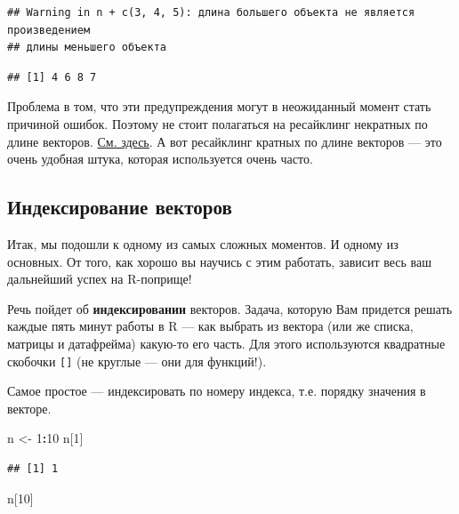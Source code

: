 \documentclass[]{book}
\newenvironment{Shaded}{\begin{snugshade}}{\end{snugshade}}
\newcommand{\DecValTok}[1]{\textcolor[rgb]{0.00,0.00,0.81}{#1}}
\newcommand{\StringTok}[1]{\textcolor[rgb]{0.31,0.60,0.02}{#1}}
\newcommand{\OperatorTok}[1]{\textcolor[rgb]{0.81,0.36,0.00}{\textbf{#1}}}
\newcommand{\NormalTok}[1]{#1}
\begin{document}
\begin{verbatim}
## Warning in n + c(3, 4, 5): длина большего объекта не является произведением
## длины меньшего объекта
\end{verbatim}

\begin{verbatim}
## [1] 4 6 8 7
\end{verbatim}

Проблема в том, что эти предупреждения могут в неожиданный момент стать
причиной ошибок. Поэтому не стоит полагаться на ресайклинг некратных по
длине векторов.
\href{https://stackoverflow.com/questions/6555651/under-what-circumstances-does-r-recycle}{См.
здесь}. А вот ресайклинг кратных по длине векторов --- это очень удобная
штука, которая используется очень часто.

\subsection{Индексирование векторов}\label{index_atomic}

Итак, мы подошли к одному из самых сложных моментов. И одному из
основных. От того, как хорошо вы научись с этим работать, зависит весь
ваш дальнейший успех на R-поприще!

Речь пойдет об \textbf{индексировании} векторов. Задача, которую Вам
придется решать каждые пять минут работы в R --- как выбрать из вектора
(или же списка, матрицы и датафрейма) какую-то его часть. Для этого
используются квадратные скобочки \texttt{{[}{]}} (не круглые --- они для
функций!).

Самое простое --- индексировать по номеру индекса, т.е. порядку значения
в векторе.

\begin{Shaded}
\begin{Highlighting}[]
\NormalTok{n <-}\StringTok{ }\DecValTok{1}\OperatorTok{:}\DecValTok{10}
\NormalTok{n[}\DecValTok{1}\NormalTok{]}
\end{Highlighting}
\end{Shaded}

\begin{verbatim}
## [1] 1
\end{verbatim}

\begin{Shaded}
\begin{Highlighting}[]
\NormalTok{n[}\DecValTok{10}\NormalTok{]}
\end{Highlighting}
\end{Shaded}
\end{document}
